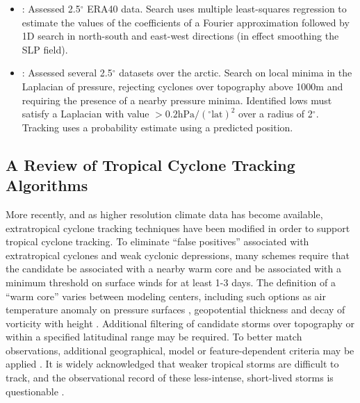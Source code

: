 \documentclass[gmdd, hvmath, online]{copernicus_discussions}
\begin{document}
\begin{itemize}
\item \cite{benestad2006use}:  Assessed 2.5$^\circ$ ERA40 data.  Search uses multiple least-squares regression to estimate the values of the coefficients of a Fourier approximation followed by 1D search in north-south and east-west directions (in effect smoothing the SLP field).

\item \cite{simmonds2008arctic}:  Assessed several 2.5$^\circ$ datasets over the arctic.  Search on local minima in the Laplacian of pressure, rejecting cyclones over topography above 1000m and requiring the presence of a nearby pressure minima.  Identified lows must satisfy a Laplacian with value $> 0.2 \mbox{hPa} / (^\circ \mbox{lat})^2$ over a radius of 2$^\circ$.  Tracking uses a probability estimate using a predicted position.


\end{itemize}

\subsection{A Review of Tropical Cyclone Tracking Algorithms} \label{sec:TropicalCycloneAlgorithms}

More recently, and as higher resolution climate data has become available, extratropical cyclone tracking techniques have been modified in order to support tropical cyclone tracking.  To eliminate ``false positives'' associated with extratropical cyclones and weak cyclonic depressions, many schemes require that the candidate be associated with a nearby warm core and be associated with a minimum threshold on surface winds for at least 1-3 days.  The definition of a ``warm core'' varies between modeling centers, including such options as air temperature anomaly on pressure surfaces \citep{vitart1997simulation,zhao2009simulations,murakami2012future}, geopotential thickness \citep{tsutsui1996simulated} and decay of vorticity with height \citep{Bengtsson2007,strachan2013investigating}.  Additional filtering of candidate storms over topography or within a specified latitudinal range may be required.  To better match observations, additional geographical, model or feature-dependent criteria may be applied \citep{camargo2002improving,walsh2007objectively,Murakami2010,Murakami2012}. It is widely acknowledged that weaker tropical storms are difficult to track, and the observational record of these less-intense, short-lived storms is questionable \citep{Landsea2010}.
\end{document}
